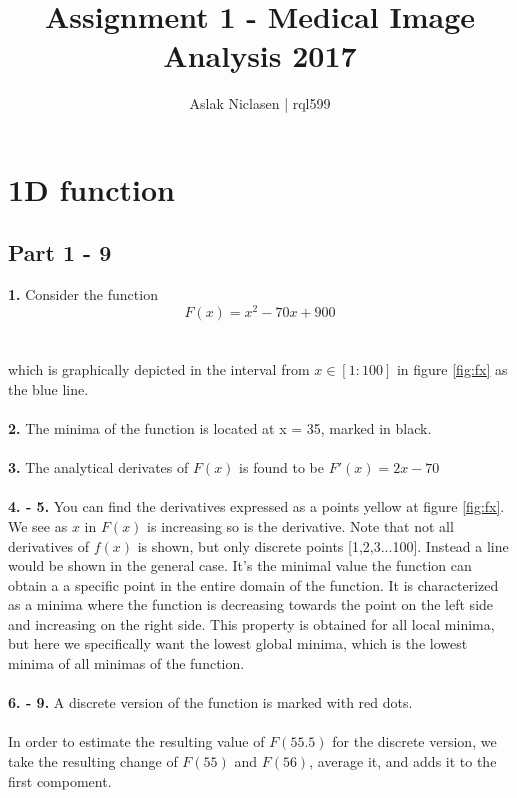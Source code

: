\documentclass[]{article}
\title{Assignment 1 - Medical Image Analysis 2017}
\author{Aslak Niclasen | rql599}
\begin{document}
\maketitle

\section{1D function}
\subsection*{Part 1 - 9}
\textbf{1.} Consider the function
\begin{equation}
	F(x) = x^2 - 70x + 900	
\end{equation}
\\\\which is graphically depicted in the interval from $x \in [1:100]$ in figure \ref{fig:fx} as the blue line.\\\\
\textbf{2.} The minima of the function is located at x = 35, marked in black.\\\\
\textbf{3.} The analytical derivates of $F(x)$ is found to be \hspace{1cm} $F'(x) = 2x - 70$\\\\
\textbf{4. - 5.} You can find the derivatives expressed as a points yellow at figure \ref{fig:fx}. We see as $x$ in $F(x)$ is increasing so is the derivative. Note that not all derivatives of $f(x)$ is shown, but only discrete points [1,2,3...100]. Instead a line would be shown in the general case. It's the minimal value the function can obtain a a specific point in the entire domain of the function. It is characterized as a minima where the function is decreasing towards the point on the left side and increasing on the right side. This property is obtained for all local minima, but here we specifically want the lowest global minima, which is the lowest minima of all minimas of the function.\\\\ 
\textbf{6. - 9.} A discrete version of the function is marked with red dots.\\\\
In order to estimate the resulting value of $F(55.5)$ for the discrete version, we take the resulting change  of $F(55)$ and $F(56)$, average it, and adds it to the first compoment.\\\\
\end{document}
